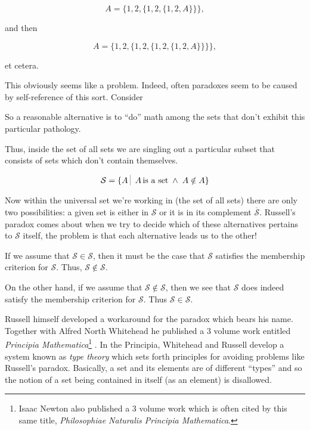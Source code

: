 \[ A = \{ 1, 2, \{ 1, 2, \{ 1, 2, A \} \} \}, \]

\noindent and then

\[ A = \{ 1, 2, \{ 1, 2, \{ 1, 2, \{ 1, 2, A \} \} \} \}, \]
  
\noindent et cetera.

This obviously seems like a problem.  Indeed, often paradoxes seem to
be caused by self-reference of this sort.  Consider 

\begin{center} 
\end{center}

So a reasonable alternative
is to ``do'' math among the sets that don't exhibit this particular
pathology.  

Thus, inside the set of all sets we are singling out a particular subset
that consists of sets which don't contain themselves.  

\[ {\mathcal S} = \{ A \suchthat \; A \,\mbox{is a set} \; \land \; A \notin A \} \]

Now within the universal set we're working in (the set of all sets) there
are only two possibilities: a given set is either in ${\mathcal S}$ or
it is in its complement $\overline{\mathcal S}$.  Russell's paradox 
comes about when we try to decide which of these alternatives pertains
to ${\mathcal S}$ itself, the problem is that each alternative leads us 
to the other!

If we assume that ${\mathcal S} \in {\mathcal S}$, then it must be the 
case that ${\mathcal S}$ satisfies the membership criterion for ${\mathcal S}$.
Thus, ${\mathcal S} \notin {\mathcal S}$.

On the other hand, if we assume that ${\mathcal S} \notin {\mathcal S}$,
then we see that ${\mathcal S}$ does indeed satisfy the membership criterion for ${\mathcal S}$.  Thus ${\mathcal S} \in {\mathcal S}$.

Russell himself developed a workaround for the paradox which
bears his name.  Together with Alfred North Whitehead he published
a 3 volume work entitled \emph{Principia Mathematica}\footnote{Isaac Newton
also published a 3 volume work which is often cited by this same title,
\emph{Philosophiae Naturalis Principia Mathematica}.} \cite{PM}.  
In the Principia, Whitehead and Russell develop a system known as 
\emph{type theory} which sets forth principles for avoiding problems
like Russell's paradox.  Basically, a set and its elements are of
different ``types'' and so the notion of a set being contained in itself
(as an element) is disallowed.

\clearpage 




%
%
%



